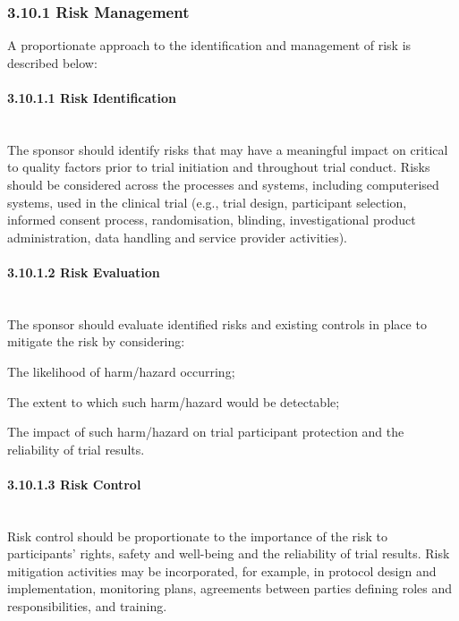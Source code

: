 \documentclass[11pt]{article}
\begin{document}
\subsubsection{3.10.1 Risk Management}

A proportionate approach to the identification and management of risk is described below:


\paragraph{3.10.1.1 Risk Identification}\mbox{}\\

The sponsor should identify risks that may have a meaningful impact on critical to quality factors prior to trial initiation and throughout trial conduct. Risks should be considered across the processes and systems, including computerised systems, used in the clinical trial (e.g., trial design, participant selection, informed consent process, randomisation, blinding, investigational product administration, data handling and service provider activities).


\paragraph{3.10.1.2 Risk Evaluation}\mbox{}\\

The sponsor should evaluate identified risks and existing controls in place to mitigate the risk by considering:


\begin{description}[leftmargin=2.5cm,style=sameline]

\item[(a)] The likelihood of harm/hazard occurring;

\item[(b)] The extent to which such harm/hazard would be detectable;

\item[(c)] The impact of such harm/hazard on trial participant protection and the reliability of trial results.

\end{description}

\paragraph{3.10.1.3 Risk Control}\mbox{}\\

Risk control should be proportionate to the importance of the risk to participants' rights, safety and well-being and the reliability of trial results. Risk mitigation activities may be incorporated, for example, in protocol design and implementation, monitoring plans, agreements between parties defining roles and responsibilities, and training.
\end{document}
